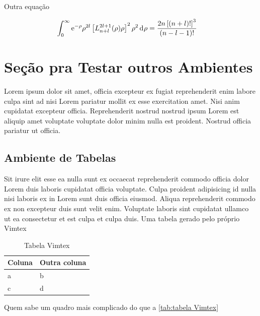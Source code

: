 Outra equação

\begin{align}
  \displaystyle\int_{0}^{\infty}\E^{-\rho}\rho^{2l}\left[L^{2l+1}_{n+l}(\rho)\rho\right]^{2}\rho^{2}\dif{\rho}&=\frac{2n\left[(n+l)!\right]^{3}}{(n-l-1)!}
\end{align}

\section{Seção pra Testar outros Ambientes} %
\label{sec:Seção pra Testar outros Ambientes}

Lorem ipsum dolor sit amet, officia excepteur ex fugiat reprehenderit enim labore culpa sint ad nisi Lorem pariatur mollit ex esse exercitation amet. Nisi anim cupidatat excepteur officia. Reprehenderit nostrud nostrud ipsum Lorem est aliquip amet voluptate voluptate dolor minim nulla est proident. Nostrud officia pariatur ut officia.

\subsection{Ambiente de Tabelas} %
\label{sub:Ambiente de Tabelas}

Sit irure elit esse ea nulla sunt ex occaecat reprehenderit commodo officia dolor Lorem duis laboris cupidatat officia voluptate. Culpa proident adipisicing id nulla nisi laboris ex in Lorem sunt duis officia eiusmod. Aliqua reprehenderit commodo ex non excepteur duis sunt velit enim. Voluptate laboris sint cupidatat ullamco ut ea consectetur et est culpa et culpa duis. Uma tabela gerado pelo próprio Vimtex

\begin{table}[!ht]
  \caption{Tabela Vimtex}
  \label{tab:tabela Vimtex}
  \begin{center}
	 \begin{tabular}[c]{l|l}
		\hline
		\multicolumn{1}{c|}{\textbf{Coluna}} & 
		\multicolumn{1}{c}{\textbf{Outra coluna}} \\
		\hline
		a & b \\
		c & d \\
		\hline
	 \end{tabular}
  \end{center}
\end{table}
Quem sabe um quadro mais complicado do que a \autoref{tab:tabela Vimtex}

